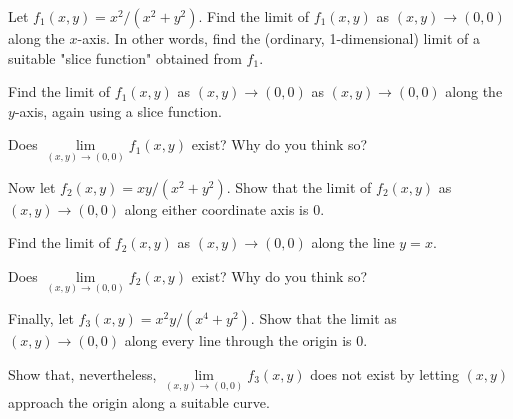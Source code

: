 \documentclass[12pt]{exam}
\begin{document}
\begin{questions}

\question Let $f_1(x,y) = x^2/(x^2 + y^2)$. Find the limit of $f_1(x,y)$ as $(x,y) \to (0,0)$ along the $x$-axis. In other words, find the (ordinary, 1-dimensional) limit of a suitable "slice function" obtained from $f_1$.


\question Find the limit of $f_1(x,y)$ as $(x,y) \to (0,0)$ as $(x,y) \to (0,0)$ along the $y$-axis, again using a slice function.


\question Does $\lim\limits_{(x,y) \to (0,0)} f_1 (x,y)$ exist? Why do you think so?


\newpage

\question Now let $f_2(x,y) = xy/(x^2 + y^2)$. Show that the limit of $f_2(x,y)$ as $(x,y) \to (0,0)$ along either coordinate axis is 0.


\question Find the limit of $f_2(x,y)$  as $(x,y) \to (0,0)$ along the line $y = x$.


\question Does $\lim\limits_{(x,y) \to (0,0)} f_2 (x,y)$ exist? Why do you think so?


\question Finally, let $f_3(x,y) = x^2 y/(x^4 + y^2)$. Show that the limit as $(x,y) \to (0,0)$ along every line through the origin is $0$.


\question Show that, nevertheless, $\lim\limits_{(x,y) \to (0,0)} f_3 (x,y)$ does not exist by letting $(x,y)$ approach the origin along a suitable curve.


\end{questions} 
\end{document}
